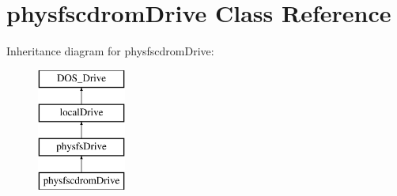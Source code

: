 \hypertarget{classphysfscdromDrive}{\section{physfscdrom\-Drive Class Reference}
\label{classphysfscdromDrive}
}
Inheritance diagram for physfscdrom\-Drive\-:\begin{figure}[H]
\begin{center}
\leavevmode
\includegraphics[height=4.000000cm]{classphysfscdromDrive}
\end{center}
\end{figure}
